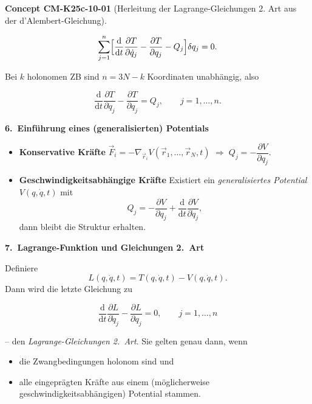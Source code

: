 \documentclass[10pt, letterpaper]{article}
\newcommand{\CustomHeading}[3]{%
  \par\medskip\noindent%
  \textbf{#1 #2} \textnormal{(#3)}.\enskip%
}
\newenvironment{CONC}[2]{\CustomHeading{Concept}{#1}{#2}}{}
\begin{document}
\begin{CONC}{CM-K25c-10-01}{Herleitung der Lagrange-Gleichungen 2. Art aus der d’Alembert-Gleichung}
\[
  \sum_{j=1}^{n}
    \Bigl[
      \frac{\mathrm d}{\mathrm dt}\frac{\partial T}{\partial\dot q_j}
      -
      \frac{\partial T}{\partial q_j}
      -
      Q_j
    \Bigr]\delta q_j=0.
\]

Bei $k$ holonomen ZB sind $n=3N-k$ Koordinaten unabhängig, also

\[
  \boxed{\;
    \frac{\mathrm d}{\mathrm dt}\frac{\partial T}{\partial\dot q_j}
    -
    \frac{\partial T}{\partial q_j}
    =Q_j,
    \qquad j=1,\dots,n .\;}
\]

\textbf{6.\ Einführung eines (generalisierten) Potentials}

\begin{itemize}
\item \textbf{Konservative Kräfte}  
      $\vec F_i=-\nabla_{\vec r_i}V(\vec r_1,\dots,\vec r_N,t)$  
      $\Longrightarrow\;Q_j=-\dfrac{\partial V}{\partial q_j}$.
\item \textbf{Geschwindigkeitsabhängige Kräfte}  
      Existiert ein \emph{generalisiertes Potential}
      $V(q,\dot q,t)$ mit
      \[
        Q_j=-\frac{\partial V}{\partial q_j}
            +\frac{\mathrm d}{\mathrm dt}
             \frac{\partial V}{\partial\dot q_j},
      \]
      dann bleibt die Struktur erhalten.
\end{itemize}

\textbf{7.\ Lagrange-Funktion und Gleichungen 2.\ Art}

Definiere
\[
  L(q,\dot q,t)=T(q,\dot q,t)-V(q,\dot q,t).
\]
Dann wird die letzte Gleichung zu

\[
  \boxed{\;
    \frac{\mathrm d}{\mathrm dt}\frac{\partial L}{\partial\dot q_j}
    -
    \frac{\partial L}{\partial q_j}=0,
    \qquad j=1,\dots,n
  \;}
\]

– den \emph{Lagrange-Gleichungen 2.\ Art}.  
Sie gelten genau dann, wenn
\begin{itemize}
  \item die Zwangbedingungen holonom sind und
  \item alle eingeprägten Kräfte aus einem (möglicherweise
        geschwindigkeitsabhängigen) Potential stammen.
\end{itemize}
\end{CONC}
\end{document}

